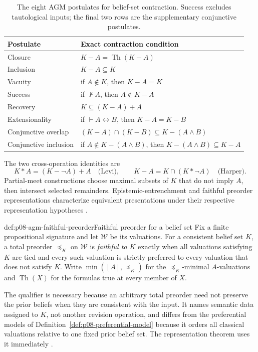 \begin{table}[htbp]
\centering\small
\begin{tabularx}{\textwidth}{@{}l X@{}}
\toprule
Postulate & Exact contraction condition \\
\midrule
Closure & \(K-A=\operatorname{Th}(K-A)\) \\
Inclusion & \(K-A\subseteq K\) \\
Vacuity & if \(A\notin K\), then \(K-A=K\) \\
Success & if \(\not\vdash A\), then \(A\notin K-A\) \\
Recovery & \(K\subseteq (K-A)+A\) \\
Extensionality & if \(\vdash A\leftrightarrow B\), then \(K-A=K-B\) \\
Conjunctive overlap &
  \((K-A)\cap(K-B)\subseteq K-(A\land B)\) \\
Conjunctive inclusion & if \(A\notin K-(A\land B)\), then
  \(K-(A\land B)\subseteq K-A\) \\
\bottomrule
\end{tabularx}
\caption{The eight AGM postulates for belief-set contraction.  Success excludes
tautological inputs; the final two rows are the supplementary conjunctive
postulates.}
\label{tab:p08-agm-contraction-postulates}
\end{table}

The two cross-operation identities are
\[
 K*A=(K-\neg A)+A
 \quad\text{(Levi)},
 \qquad
 K-A=K\cap(K*\neg A)
 \quad\text{(Harper)}.
\]
Partial-meet constructions choose maximal subsets of \(K\) that do not imply
\(A\), then intersect selected remainders.  Epistemic-entrenchment and
faithful preorder representations characterize equivalent presentations under
their respective representation hypotheses
\cite{AlchourronGardenforsMakinson1985}.

\begin{hbdefinition}{def:p08-agm-faithful-preorder}{Faithful preorder for a belief set}
Fix a finite propositional signature and let \(\mathcal W\) be its valuations.
For a consistent belief set \(K\), a total preorder \(\preceq_K\) on
\(\mathcal W\) is \emph{faithful to \(K\)} exactly when all valuations
satisfying \(K\) are tied and every such valuation is strictly preferred to
every valuation that does not satisfy \(K\).  Write
\(\min([A],\preceq_K)\) for the \(\preceq_K\)-minimal \(A\)-valuations and
\(\operatorname{Th}(X)\) for the formulas true at every member of \(X\).

The qualifier is necessary because an arbitrary total preorder need not
preserve the prior beliefs when they are consistent with the input.  It names
semantic data assigned to \(K\), not another revision operation, and differs
from the preferential models of Definition~\ref{def:p08-preferential-model}
because it orders all classical valuations relative to one fixed prior belief
set.  The representation theorem uses it immediately
\cite{KatsunoMendelzon1991}.
\end{hbdefinition}

